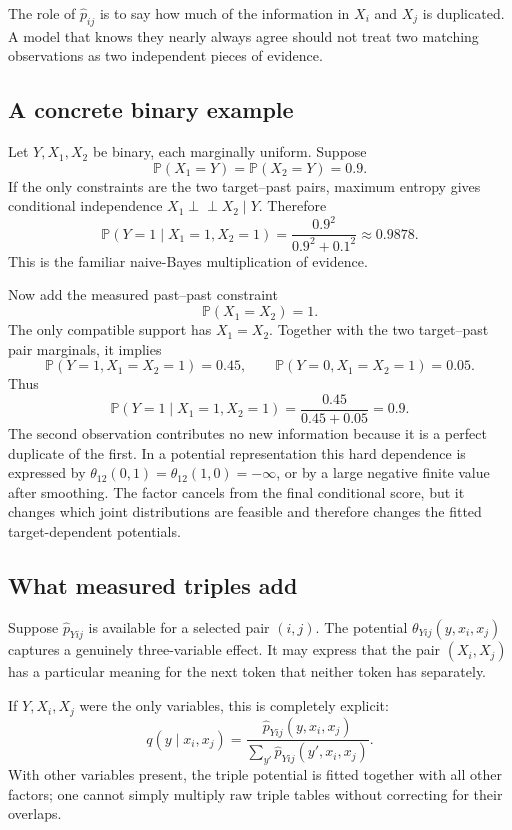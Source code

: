 \documentclass[11pt]{article}
\newcommand{\Pp}{\mathbb P}
\newcommand{\1}{\mathbf 1}
\newcommand{\ind}{\mathop{\perp}\!\!\!\perp}
\newcommand{\hatp}{\widehat p}
\begin{document}
The role of \(\hatp_{ij}\) is to say how much of the information in \(X_i\) and
\(X_j\) is duplicated.  A model that knows they nearly always agree should not
treat two matching observations as two independent pieces of evidence.

\subsection{A concrete binary example}

Let \(Y,X_1,X_2\) be binary, each marginally uniform.  Suppose
\[
  \Pp(X_1=Y)=\Pp(X_2=Y)=0.9.
\]
If the only constraints are the two target--past pairs, maximum entropy gives
conditional independence \(X_1\ind X_2\mid Y\).  Therefore
\[
  \Pp(Y=1\mid X_1=1,X_2=1)
  =
  \frac{0.9^2}{0.9^2+0.1^2}
  \approx 0.9878.
\]
This is the familiar naive-Bayes multiplication of evidence.

Now add the measured past--past constraint
\[
  \Pp(X_1=X_2)=1.
\]
The only compatible support has \(X_1=X_2\).  Together with the two
target--past pair marginals, it implies
\[
  \Pp(Y=1,X_1=X_2=1)=0.45,\qquad
  \Pp(Y=0,X_1=X_2=1)=0.05.
\]
Thus
\[
  \Pp(Y=1\mid X_1=1,X_2=1)=\frac{0.45}{0.45+0.05}=0.9.
\]
The second observation contributes no new information because it is a perfect
duplicate of the first.  In a potential representation this hard dependence is
expressed by \(\theta_{12}(0,1)=\theta_{12}(1,0)=-\infty\), or by a large
negative finite value after smoothing.  The factor cancels from the final
conditional score, but it changes which joint distributions are feasible and
therefore changes the fitted target-dependent potentials.

\subsection{What measured triples add}

Suppose \(\hatp_{Yij}\) is available for a selected pair \((i,j)\).  The
potential \(\theta_{Yij}(y,x_i,x_j)\) captures a genuinely three-variable
effect.  It may express that the pair \((X_i,X_j)\) has a particular meaning for
the next token that neither token has separately.

If \(Y,X_i,X_j\) were the only variables, this is completely explicit:
\[
  q(y\mid x_i,x_j)
  =
  \frac{\hatp_{Yij}(y,x_i,x_j)}
       {\sum_{y'}\hatp_{Yij}(y',x_i,x_j)}.
\]
With other variables present, the triple potential is fitted together with all
other factors; one cannot simply multiply raw triple tables without correcting
for their overlaps.
\end{document}
